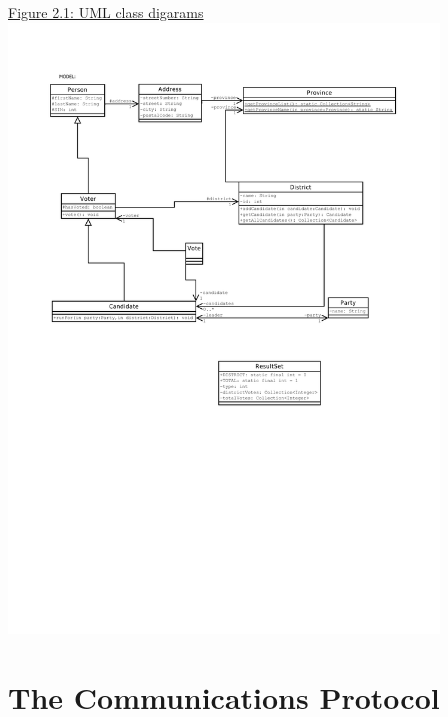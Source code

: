 \documentclass[11pt,english]{article}
\begin{document}
\underline{Figure 2.1: UML class digarams}
\vspace{5mm}\\
\includegraphics[width=4.5in]{figures/uml.pdf}


\section{The Communications Protocol}
\end{document}
